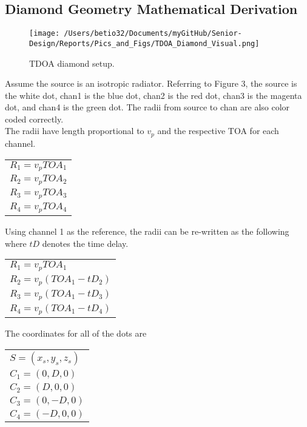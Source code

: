 \documentclass[12pt]{article}
\begin{document}
\subsection{Diamond Geometry Mathematical Derivation}
\begin{figure}[!h]
	\centering
	\texttt{[image: /Users/betio32/Documents/myGitHub/Senior-Design/Reports/Pics\_and\_Figs/TDOA\_Diamond\_Visual.png]}
    \caption{TDOA diamond setup.} \label{fig:TDOA Diamond Visual}
\end{figure}  

\pagebreak
\noindent Assume the source is an isotropic radiator. Referring to Figure 3, the source is the white dot, chan1 is the blue dot, chan2 is the red dot, chan3 is the magenta dot, and chan4 is the green dot. The radii from source to chan are also color coded correctly.\\

\noindent The radii have length proportional to $v_p$ and the respective TOA for each channel.

\begin{center}
\begin{tabular}{l}
$R_1 = v_p TOA_1$\\
$R_2 = v_p TOA_2$\\
$R_3 = v_p TOA_3$\\
$R_4 = v_p TOA_4$\\
\end{tabular}
\end{center}

\noindent Using channel 1 as the reference, the radii can be re-written as the following where $tD$ denotes the time delay.

\begin{center}
\begin{tabular}{l}
$R_1 = v_p TOA_1$\\
$R_2 = v_p (TOA_1 - tD_2)$\\
$R_3 = v_p (TOA_1 - tD_3)$\\
$R_4 = v_p (TOA_1 - tD_4)$\\
\end{tabular}
\end{center}

\noindent The coordinates for all of the dots are

\begin{center}
\begin{tabular}{l}
$S = (x_s,y_s,z_s)$\\
$C_1 = (0,D,0)$\\
$C_2 = (D,0,0)$\\
$C_3 = (0,-D,0)$\\
$C_4 = (-D,0,0)$\\
\end{tabular}
\end{center}
\end{document}
